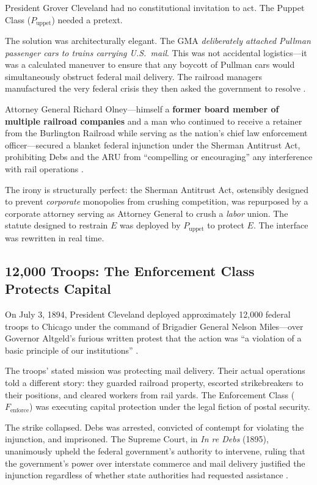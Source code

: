 \documentclass[12pt,openany]{book}
\begin{document}
President Grover Cleveland had no constitutional invitation to act. The Puppet Class ($P_{\text{uppet}}$) needed a pretext.

The solution was architecturally elegant. The GMA \textit{deliberately attached Pullman passenger cars to trains carrying U.S.\ mail}. This was not accidental logistics---it was a calculated maneuver to ensure that any boycott of Pullman cars would simultaneously obstruct federal mail delivery. The railroad managers manufactured the very federal crisis they then asked the government to resolve \cite{lindsey_pullman, papke_pullman}.

Attorney General Richard Olney---himself a \textbf{former board member of multiple railroad companies} and a man who continued to receive a retainer from the Burlington Railroad while serving as the nation's chief law enforcement officer---secured a blanket federal injunction under the Sherman Antitrust Act, prohibiting Debs and the ARU from ``compelling or encouraging'' any interference with rail operations \cite{papke_pullman, salvatore_debs}.

The irony is structurally perfect: the Sherman Antitrust Act, ostensibly designed to prevent \textit{corporate} monopolies from crushing competition, was repurposed by a corporate attorney serving as Attorney General to crush a \textit{labor} union. The statute designed to restrain $E$ was deployed by $P_{\text{uppet}}$ to protect $E$. The interface was rewritten in real time.

\subsection{12,000 Troops: The Enforcement Class Protects Capital}

On July 3, 1894, President Cleveland deployed approximately 12,000 federal troops to Chicago under the command of Brigadier General Nelson Miles---over Governor Altgeld's furious written protest that the action was ``a violation of a basic principle of our institutions'' \cite{lindsey_pullman}.

The troops' stated mission was protecting mail delivery. Their actual operations told a different story: they guarded railroad property, escorted strikebreakers to their positions, and cleared workers from rail yards. The Enforcement Class ($F_{\text{enforce}}$) was executing capital protection under the legal fiction of postal security.

The strike collapsed. Debs was arrested, convicted of contempt for violating the injunction, and imprisoned. The Supreme Court, in \textit{In re Debs} (1895), unanimously upheld the federal government's authority to intervene, ruling that the government's power over interstate commerce and mail delivery justified the injunction regardless of whether state authorities had requested assistance \cite{inredebs}.
\end{document}
